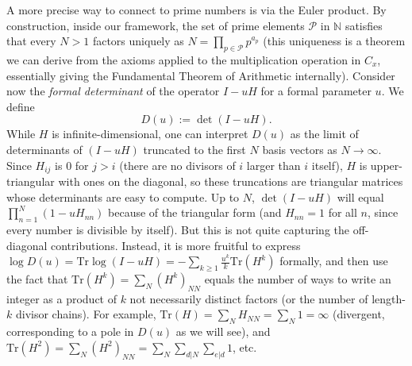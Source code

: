 \documentclass[11pt]{article}
\begin{document}
A more precise way to connect to prime numbers is via the Euler product. By construction, inside our framework, the set of prime elements $\mathcal{P}$ in $\mathbb{N}$ satisfies that every $N>1$ factors uniquely as $N=\prod_{p\in \mathcal{P}} p^{a_p}$ (this uniqueness is a theorem we can derive from the axioms applied to the multiplication operation in $C_x$, essentially giving the Fundamental Theorem of Arithmetic internally). Consider now the \emph{formal determinant} of the operator $I - uH$ for a formal parameter $u$. We define 
\[ D(u) := \det(I - uH). \] 
While $H$ is infinite-dimensional, one can interpret $D(u)$ as the limit of determinants of $(I - uH)$ truncated to the first $N$ basis vectors as $N\to\infty$. Since $H_{ij}$ is 0 for $j>i$ (there are no divisors of $i$ larger than $i$ itself), $H$ is upper-triangular with ones on the diagonal, so these truncations are triangular matrices whose determinants are easy to compute. Up to $N$, $\det(I - uH)$ will equal $\prod_{n=1}^N (1 - u H_{nn})$ because of the triangular form (and $H_{nn}=1$ for all $n$, since every number is divisible by itself). But this is not quite capturing the off-diagonal contributions. Instead, it is more fruitful to express $\log D(u) = \mathrm{Tr}\log(I-uH) = -\sum_{k\ge1} \frac{u^k}{k} \mathrm{Tr}(H^k)$ formally, and then use the fact that $\mathrm{Tr}(H^k) = \sum_N (H^k)_{NN}$ equals the number of ways to write an integer as a product of $k$ not necessarily distinct factors (or the number of length-$k$ divisor chains). For example, $\mathrm{Tr}(H) = \sum_N H_{NN} = \sum_N 1 = \infty$ (divergent, corresponding to a pole in $D(u)$ as we will see), and $\mathrm{Tr}(H^2) = \sum_N (H^2)_{NN} = \sum_N \sum_{d|N}\sum_{e|d} 1$, etc.
\end{document}
